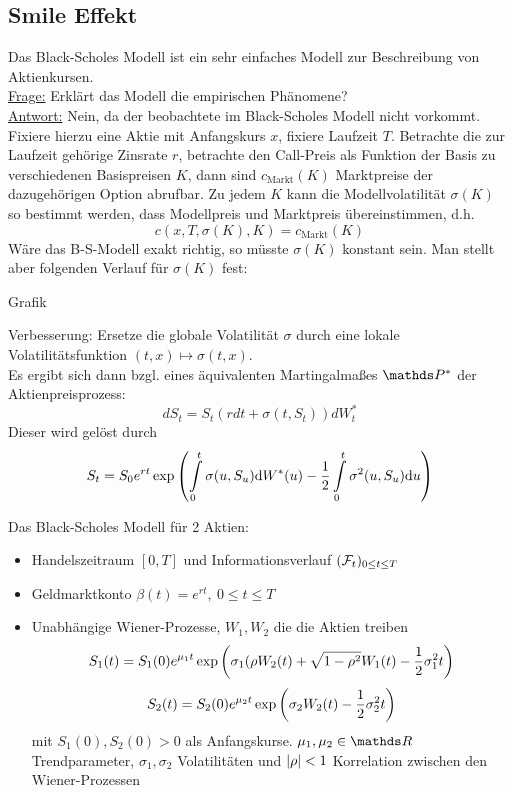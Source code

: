 \subsection{Smile Effekt}
\label{sub:smile_effekt}
Das Black-Scholes Modell ist ein sehr einfaches Modell zur Beschreibung von Aktienkursen.\\
\uline{Frage:}
Erklärt das Modell die empirischen Phänomene?\\
\uline{Antwort:}
Nein, da der beobachtete  im Black-Scholes Modell nicht vorkommt.\\
Fixiere hierzu eine Aktie mit Anfangskurs $x$, fixiere Laufzeit $T$. 
Betrachte die zur Laufzeit gehörige Zinsrate $r$, betrachte den Call-Preis als Funktion der Basis zu verschiedenen Basispreisen $K$, dann sind $c_{\text{Markt}}(K)$ Marktpreise der dazugehörigen Option abrufbar.
Zu jedem $K$ kann die Modellvolatilität $\sigma(K)$ so bestimmt werden, dass Modellpreis und Marktpreis übereinstimmen, d.h.
\[
c(x,T,\sigma(K),K)=c_{\text{Markt}}(K)
\]
Wäre das B-S-Modell exakt richtig, so müsste $\sigma(K)$ konstant sein.
Man stellt aber folgenden Verlauf für $\sigma(K)$ fest:
\begin{center}
	Grafik
\end{center}
Verbesserung:
Ersetze die globale Volatilität $\sigma$ durch eine lokale Volatilitätsfunktion $(t,x)\mapsto \sigma(t,x)$.\\
Es ergibt sich dann bzgl. eines äquivalenten Martingalmaßes $\Pw^*$ der Aktienpreisprozess:
\[
dS_t=S_t(rdt+\sigma(t,S_t))dW_t^*
\]
Dieser wird gelöst durch
\[
S_t=S_0e^{rt}\exp\left( \int\limits_0^t \sigma(u,S_u)\mathrm{d} W^*(u)-\frac{1}{2}\int\limits_0^t \sigma^2(u,S_u)\mathrm{d} u\right)
\]

Das Black-Scholes Modell für 2 Aktien:
\begin{itemize}
	\item Handelszeitraum $[0,T]$ und Informationsverlauf $(\mathcal{F}_t)_{0\le t\le T}$
	\item Geldmarktkonto $\beta(t)=e^{rt},~0\le t\le T$
	\item Unabhängige Wiener-Prozesse, $W_1,W_2$ die die Aktien treiben
	\[
	S_1(t)=S_1(0)e^{\mu_1t}\exp\left( \sigma_1(\rho W_2(t)+\sqrt{1-\rho^2}W_1(t)-\frac{1}{2}\sigma_1^2t\right)
	\]
	\[
	S_2(t)=S_2(0)e^{\mu_2t}\exp\left( \sigma_2 W_2(t)-\frac{1}{2}\sigma_2^2t\right)
	\]
	mit $S_1(0),S_2(0)>0$ als Anfangskurse.
	$\mu_1,\mu_2\in \R$ Trendparameter, $\sigma_1,\sigma_2$ Volatilitäten und $\left\vert\rho\right\vert<1$ Korrelation zwischen den Wiener-Prozessen
\end{itemize}

